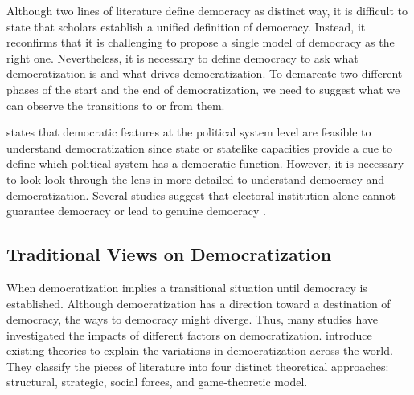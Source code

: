 \documentclass[11pt]{article}
\begin{document}
Although two lines of literature define democracy as distinct way, it is difficult to state that scholars establish a unified definition of democracy. Instead, it reconfirms that it is challenging to propose a single model of democracy as the right one. Nevertheless, it is necessary to define democracy to ask what democratization is and what drives democratization. To demarcate two different phases of the start and the end of democratization, we need to suggest what we can observe the transitions to or from them.

\citet[44]{Warren2017} states that democratic features at the political system level are feasible to understand democratization since state or statelike capacities provide a cue to define which political system has a democratic function. However, it is necessary to look look through the lens in more detailed to understand democracy and democratization. Several studies suggest that electoral institution alone cannot guarantee democracy or lead to genuine democracy \citep{Miller2015a, Miller2015b, Wahman2013, Levitsky2010a, Hadenius2007}.

\subsection*{Traditional Views on Democratization}

When democratization implies a transitional situation until democracy is established. Although democratization has a direction toward a destination of democracy, the ways to democracy might diverge. Thus, many studies have investigated the impacts of different factors on democratization. \citet[71]{Bergschlosser2007ch2} introduce existing theories to explain the variations in democratization across the world. They classify the pieces of literature into four distinct theoretical approaches: structural, strategic, social forces, and game-theoretic model.
\end{document}
